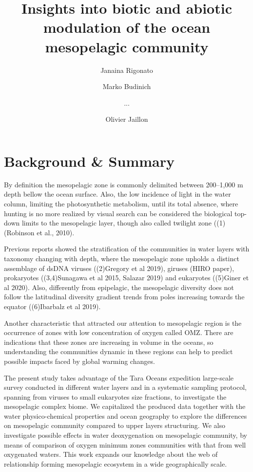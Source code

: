 \documentclass[fleqn,10pt]{wlscirep}
\title{Insights into biotic and abiotic modulation of the ocean mesopelagic community}
\author[1,$\dag$]{Janaina Rigonato}
\author[2,$\dag$]{Marko Budinich}
\author[1,2]{...}
\author[1,*]{Olivier Jaillon}
\affil[1]{Genoscope, department, city, postcode, country}
\affil[2]{GO-SEE, department, Roscoff, postcode, country}
\affil[*]{corresponding author(s): Olivier Jaillon (corresponding.author@email.example)}
\affil[$\dag$]{these authors contributed equally to this work}
\begin{document}
\flushbottom
\maketitle

\thispagestyle{empty}



\section*{Background \& Summary}

By definition the mesopelagic zone is commonly delimited between 200–1,000 m depth bellow the ocean surface. Also, the low incidence of light in the water column, limiting the photosynthetic metabolism, until its total absence, where hunting is no more realized by visual search can be considered the biological top-down limits to the mesopelagic layer, though also called twilight zone ((1)(Robinson et al., 2010).

Previous reports showed the stratification of the communities in water layers with taxonomy changing with depth, where the mesopelagic zone upholds a distinct assemblage  of dsDNA viruses ((2)Gregory et al 2019), giruses (HIRO paper), prokaryotes ((3,4)Sunagawa et al 2015, Salazar 2019) and eukaryotes ((5)Giner et al 2020). Also, differently from epipelagic, the mesopelagic diversity does not follow the latitudinal diversity gradient trends from poles increasing towards the equator ((6)Ibarbalz et al 2019).

Another characteristic that attracted our attention to mesopelagic region is the occurrence of zones with low concentration of oxygen called OMZ. There are indications that these zones are increasing in volume in the oceans, so understanding the communities dynamic in these regions can help to predict possible impacts faced by global warming changes.

The present study takes advantage of the Tara Oceans expedition large-scale survey conducted in different water layers and in a systematic sampling protocol, spanning from viruses to small eukaryotes size fractions, to investigate the mesopelagic complex biome. We capitalized the produced data together with the water physico-chemical properties and ocean geography to explore the differences on mesopelagic community compared to upper layers structuring. We also investigate possible effects in water deoxygenation on mesopelagic community, by means of comparison of oxygen minimum zones communities with that from well oxygenated waters. This work expands our knowledge about the web of relationship forming mesopelagic ecosystem in a wide geographically scale.
\end{document}
